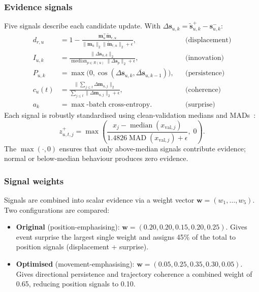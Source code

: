 \documentclass[10pt,twocolumn]{article}
\begin{document}
\subsubsection{Evidence signals}

Five signals describe each candidate update.  With $\Delta\mathbf{s}_{u,k}
=\widetilde{\mathbf{s}}_{u,k}^+-\mathbf{s}_{u,k}^-$:
\begin{align}
  d_{r,u} &= 1 - \frac{\mathbf{m}_u^\top\widetilde{\mathbf{m}}_{r,u}}
    {\|\mathbf{m}_u\|_2\|\widetilde{\mathbf{m}}_{r,u}\|_2+\epsilon},
  & &\text{(displacement)} \nonumber\\
  I_{u,k} &= \frac{\|\Delta\mathbf{s}_{u,k}\|_2}
    {\operatorname{median}_{p\in\mathcal{R}(u)}\|\Delta\mathbf{s}_p\|_2
    +\epsilon},
  & &\text{(innovation)} \nonumber\\
  P_{u,k} &= \max\!\bigl(0,\cos(\Delta\mathbf{s}_{u,k},
    \overline{\Delta\mathbf{s}}_{u,k-1})\bigr),
  & &\text{(persistence)} \nonumber\\
  c_u(t) &= \frac{\|\sum_{j\leq t}\Delta\mathbf{m}_{u,j}\|_2}
    {\sum_{j\leq t}\|\Delta\mathbf{m}_{u,j}\|_2+\epsilon},
  & &\text{(coherence)} \nonumber\\
  a_k &= \max\text{-batch cross-entropy}.
  & &\text{(surprise)}
  \label{eq:signals}
\end{align}
Each signal is robustly standardised using clean-validation medians and
MADs~\cite{rousseeuw1993mad}:
\begin{equation}
  z_{u,t,j}^+ = \max\!\left(
    \frac{x_j-\operatorname{median}(x_{\mathrm{val},j})}
    {1.4826\operatorname{MAD}(x_{\mathrm{val},j})+\epsilon},\;0\right).
  \label{eq:robustz}
\end{equation}
The $\max(\cdot,0)$ ensures that only above-median signals contribute
evidence; normal or below-median behaviour produces zero evidence.

\subsubsection{Signal weights}

Signals are combined into scalar evidence via a weight vector
$\mathbf{w}=(w_1,\ldots,w_5)$.  Two configurations are compared:
\begin{itemize}
  \item \textbf{Original} (position-emphasising):
    $\mathbf{w}=(0.20,0.20,0.15,0.20,0.25)$.  Gives event surprise the
    largest single weight and assigns 45\% of the total to position signals
    (displacement + surprise).
  \item \textbf{Optimised} (movement-emphasising):
    $\mathbf{w}=(0.05,0.25,0.35,0.30,0.05)$.  Gives directional persistence
    and trajectory coherence a combined weight of 0.65, reducing position
    signals to 0.10.
\end{itemize}
\end{document}
